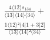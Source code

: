 \documentclass[varwidth, border=5pt]{standalone}
\begin{document}
\begin{my}
$\begin{gathered}
\scriptscriptstyle\frac{4⟨12⟩s_{134}}{⟨13⟩⟨14⟩⟨34⟩} +\\
\scriptscriptstyle\frac{1⟨12⟩²⟨4|1+3|2]}{⟨13⟩⟨14⟩²⟨34⟩} \phantom{+}
\end{gathered}$
\end{my}
\end{document}
